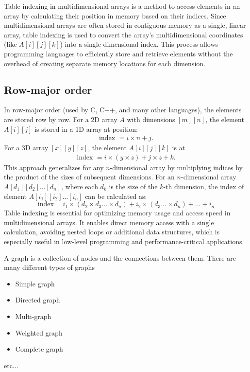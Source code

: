 \documentclass{report}
\begin{document}
\pagebreak 
{}
\bigbreak \noindent 
Table indexing in multidimensional arrays is a method to access elements in an array by calculating their position in memory based on their indices. Since multidimensional arrays are often stored in contiguous memory as a single, linear array, table indexing is used to convert the array's multidimensional coordinates (like $A[i][j][k]$) into a single-dimensional index. This process allows programming languages to efficiently store and retrieve elements without the overhead of creating separate memory locations for each dimension.
\bigbreak \noindent 
\subsection{Row-major order}
\bigbreak \noindent 
In row-major order (used by C, C++, and many other languages), the elements are stored row by row. For a 2D array $A$ with dimensions $[m][n]$, the element $A[i][j]$ is stored in a 1D array at position:
\begin{align*}
    \text{index } = i \times n + j 
.\end{align*}
\bigbreak \noindent 
For a 3D array $[x][y][z]$, the element $A[i][j][k]$ is at
\begin{align*}
    \text{index } = i \times (y \times z ) + j \times z + k
.\end{align*}
\bigbreak \noindent 
This approach generalizes for any $n$-dimensional array by multiplying indices by the product of the sizes of subsequent dimensions.
\bigbreak \noindent 
For an \( n \)-dimensional array \( A[d_1][d_2] \ldots [d_n] \), where each \( d_k \) is the size of the \( k \)-th dimension, the index of element \( A[i_1][i_2] \ldots [i_n] \) can be calculated as:
\bigbreak \noindent 
\[
\text{index} = i_1 \times (d_2 \times d_3 \ldots \times d_n) + i_2 \times (d_3 \ldots \times d_n) + \ldots + i_n
\]
\bigbreak \noindent 
Table indexing is essential for optimizing memory usage and access speed in multidimensional arrays. It enables direct memory access with a single calculation, avoiding nested loops or additional data structures, which is especially useful in low-level programming and performance-critical applications.

\pagebreak 
{}
\bigbreak \noindent 
A graph is a collection of nodes and the connections between them. There are many different types of graphs
\bigbreak \noindent 
\begin{itemize}
    \item Simple graph
    \item Directed graph
    \item Multi-graph
    \item Weighted graph
    \item Complete graph
\end{itemize}
etc...
\bigbreak \noindent 
\end{document}
